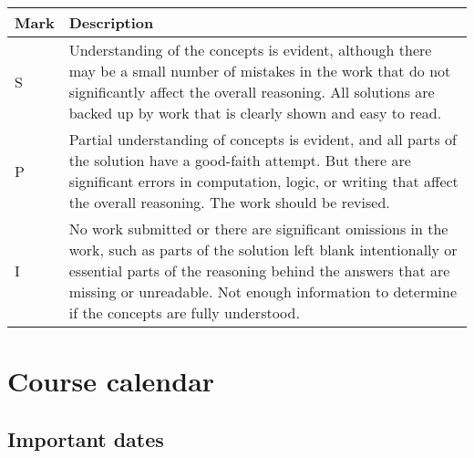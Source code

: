 \begin{longtable}[]{@{}ll@{}}
\toprule
\begin{minipage}[b]{0.30\columnwidth}\raggedright
Mark\strut
\end{minipage} & \begin{minipage}[b]{0.64\columnwidth}\raggedright
Description\strut
\end{minipage}\tabularnewline
\midrule
\endhead
\begin{minipage}[t]{0.30\columnwidth}\raggedright
S\strut
\end{minipage} & \begin{minipage}[t]{0.64\columnwidth}\raggedright
Understanding of the concepts is evident, although there may be a small
number of mistakes in the work that do not significantly affect the
overall reasoning. All solutions are backed up by work that is clearly
shown and easy to read.\strut
\end{minipage}\tabularnewline
\begin{minipage}[t]{0.30\columnwidth}\raggedright
P\strut
\end{minipage} & \begin{minipage}[t]{0.64\columnwidth}\raggedright
Partial understanding of concepts is evident, and all parts of the
solution have a good-faith attempt. But there are significant errors in
computation, logic, or writing that affect the overall reasoning. The
work should be revised.\strut
\end{minipage}\tabularnewline
\begin{minipage}[t]{0.30\columnwidth}\raggedright
I\strut
\end{minipage} & \begin{minipage}[t]{0.64\columnwidth}\raggedright
No work submitted or there are significant omissions in the work, such
as parts of the solution left blank intentionally or essential parts of
the reasoning behind the answers that are missing or unreadable. Not
enough information to determine if the concepts are fully
understood.\strut
\end{minipage}\tabularnewline
\bottomrule
\end{longtable}

\newpage

\hypertarget{course-calendar}{%
\section{Course calendar}\label{course-calendar}}

\hypertarget{important-dates}{%
\subsection{Important dates}\label{important-dates}}

